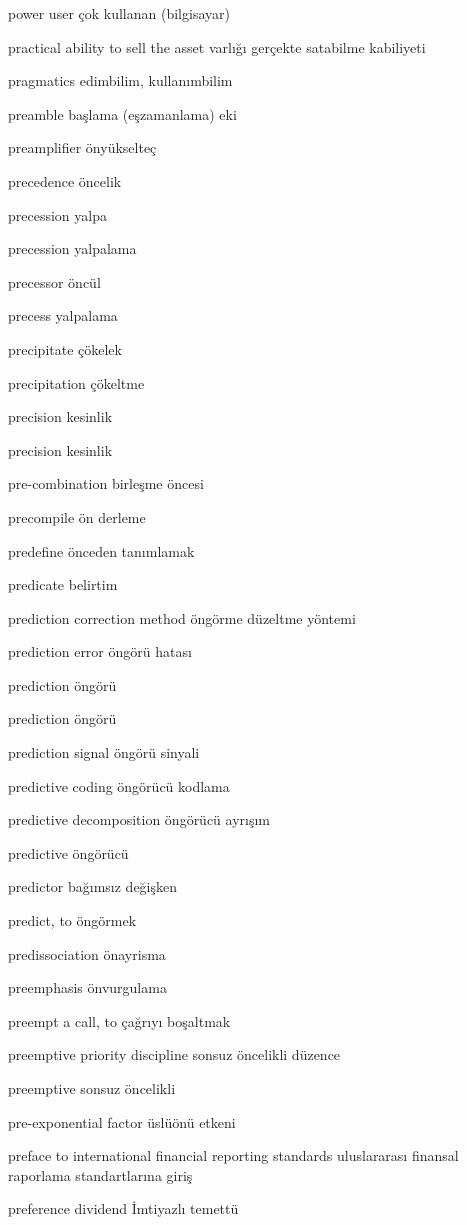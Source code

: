 \documentclass[12pt,fleqn]{article}\usepackage{../../common}
\begin{document}
power user çok kullanan (bilgisayar)

practical ability to sell the asset varlığı gerçekte satabilme kabiliyeti

pragmatics edimbilim, kullanımbilim

preamble başlama (eşzamanlama) eki

preamplifier önyükselteç

precedence öncelik

precession yalpa

precession yalpalama

precessor öncül

precess yalpalama

precipitate çökelek

precipitation çökeltme

precision kesinlik

precision kesinlik

pre-combination birleşme öncesi

precompile ön derleme

predefine önceden tanımlamak

predicate belirtim

prediction correction method öngörme düzeltme yöntemi

prediction error öngörü hatası

prediction öngörü

prediction öngörü

prediction signal öngörü sinyali

predictive coding öngörücü kodlama

predictive decomposition öngörücü ayrışım

predictive öngörücü

predictor bağımsız değişken

predict, to öngörmek

predissociation önayrisma

preemphasis önvurgulama

preempt a call, to çağrıyı boşaltmak

preemptive priority discipline sonsuz öncelikli düzence

preemptive sonsuz öncelikli

pre-exponential factor üslüönü etkeni

preface to international financial reporting standards uluslararası finansal raporlama standartlarına giriş

preference dividend İmtiyazlı temettü
\end{document}

